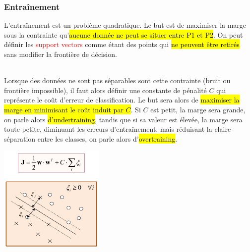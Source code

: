 \documentclass[letterpaper, 12pt]{article}
\newcommand{\alinea}{
\hspace*{0.5cm}}
\newcommand{\red}[1]{
	\textcolor{red}{#1}}
\begin{document}
			\subsubsection{Entraînement}
				\alinea L'entraînement est un problème quadratique. Le but est de maximiser la marge sous la contrainte qu'\hl{aucune
					donnée ne peut se situer entre P1 et P2}. On peut définir les \red{support vectors} comme étant des points qui \hl{ne
					peuvent être retirés} sans modifier la frontière de décision. \\
				~\\
				\begin{minipage}{0.65\textwidth}
					\alinea Lorsque des données ne sont pas séparables sont cette contrainte (bruit ou frontière impossible), il 
						faut alors définir une constante de pénalité $C$ qui représente le coût d'erreur de classification. Le but
						sera alors de \hl{maximiser la marge en minimisant le coût induit par $C$}. Si $C$ est petit, la marge sera
						grande, on parle alors \hl{d'undertraining}, tandis que si sa valeur est élevée, la marge sera toute petite,
						diminuant les erreurs d'entraînement, mais réduisant la claire séparation entre les classes, on parle alors
						d'\hl{overtraining}.
				\end{minipage}\hfill
				\begin{minipage}{0.33\textwidth}
					\begin{center}
						\includegraphics[width=2in]{Images/svm2}
					\end{center}			
				\end{minipage} ~\\~\\~\\
\end{document}
